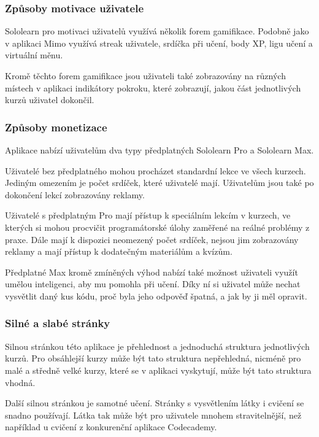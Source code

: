 \subsubsection{Způsoby motivace uživatele}

Sololearn pro motivaci uživatelů využívá několik forem gamifikace. Podobně jako v aplikaci Mimo využívá streak uživatele, srdíčka při učení, body XP, ligu učení a virtuální měnu.

Kromě těchto forem gamifikace jsou uživateli také zobrazovány na různých místech v aplikaci indikátory pokroku, které zobrazují, jakou část jednotlivých kurzů uživatel dokončil.

\subsubsection{Způsoby monetizace}

Aplikace nabízí uživatelům dva typy předplatných Sololearn Pro a Sololearn Max.

Uživatelé bez předplatného mohou procházet standardní lekce ve všech kurzech. Jediným omezením je počet srdíček, které uživatelé mají. Uživatelům jsou také po dokončení lekcí zobrazovány reklamy.

Uživatelé s předplatným Pro mají přístup k speciálním lekcím v kurzech, ve kterých si mohou procvičit programátorské úlohy zaměřené na reálné problémy z praxe. Dále mají k dispozici neomezený počet srdíček, nejsou jim zobrazovány reklamy a mají přístup k dodatečným materiálům a kvízům.

Předplatné Max kromě zmíněných výhod nabízí také možnost uživateli využít umělou inteligenci, aby mu pomohla při učení. Díky ní si uživatel může nechat vysvětlit daný kus kódu, proč byla jeho odpověď špatná, a jak by ji měl opravit. 

\subsubsection{Silné a slabé stránky}

Silnou stránkou této aplikace je přehlednost a jednoduchá struktura jednotlivých kurzů. Pro obsáhlejší kurzy může být tato struktura nepřehledná, nicméně pro malé a středně velké kurzy, které se v aplikaci vyskytují, může být tato struktura vhodná.

Další silnou stránkou je samotné učení. Stránky s vysvětlením látky i cvičení se snadno používají. Látka tak může být pro uživatele mnohem stravitelnější, než například u cvičení z konkurenční aplikace Codecademy.

